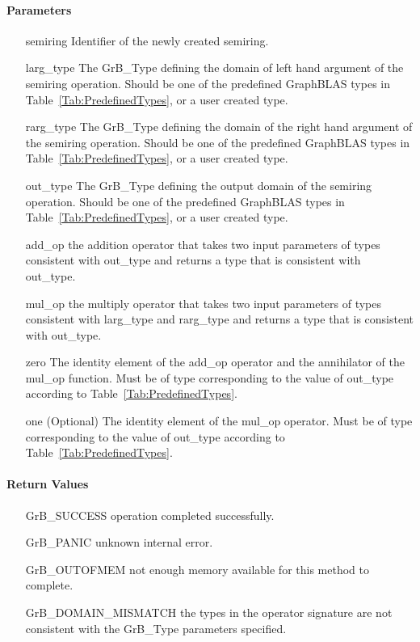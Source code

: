\paragraph{Parameters}

\begin{itemize}[leftmargin=1.1in]
    \item[{\sf semiring}]       Identifier of the newly created semiring.
    \item[{\sf larg\_type}]     The {\sf GrB\_Type} defining the domain of left hand argument of
    the semiring operation. Should be one of the predefined
    GraphBLAS types in Table~\ref{Tab:PredefinedTypes}, or a user created type.
    \item[{\sf rarg\_type}]     The {\sf GrB\_Type} defining the domain of the right hand 
    argument of the semiring operation. Should be one of the predefined
    GraphBLAS types in Table~\ref{Tab:PredefinedTypes}, or a user created type.
    \item[{\sf out\_type}]      The {\sf GrB\_Type} defining the output domain of the semiring
    operation. Should be one of the predefined
    GraphBLAS types in Table~\ref{Tab:PredefinedTypes}, or a user created type.
    \item[{\sf add\_op}]        the addition operator that takes two input parameters
    of types consistent with {\sf out\_type} and returns a type that is consistent with {\sf out\_type}.
    \item[{\sf mul\_op}]        the multiply operator that takes two input parameters
    of types consistent with {\sf larg\_type} and {\sf rarg\_type} and returns a type that is consistent with {\sf out\_type}.
    \item[{\sf zero}]           The identity element of the {\sf add\_op} operator and the
    annihilator of the {\sf mul\_op} function.   Must be of type corresponding to the
    value of {\sf out\_type} according to Table~\ref{Tab:PredefinedTypes}.
    \item[{\sf one}]            (Optional) The identity element of the {\sf mul\_op} operator. 
    Must be of type corresponding to the value of {\sf out\_type} according to
    Table~\ref{Tab:PredefinedTypes}.
\end{itemize}


\paragraph{Return Values}

\begin{itemize}[leftmargin=2.1in]
\item[{\sf GrB\_SUCCESS}]           operation completed successfully.
\item[{\sf GrB\_PANIC}]             unknown internal error.
\item[{\sf GrB\_OUTOFMEM}]          not enough memory available for this method to complete.
\item[{\sf GrB\_DOMAIN\_MISMATCH}]  the types in the operator signature are not   
                                    consistent with the {\sf GrB\_Type} parameters specified.
\end{itemize}

